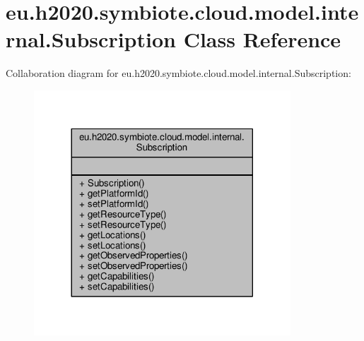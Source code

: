 \hypertarget{classeu_1_1h2020_1_1symbiote_1_1cloud_1_1model_1_1internal_1_1Subscription}{}\section{eu.\+h2020.\+symbiote.\+cloud.\+model.\+internal.\+Subscription Class Reference}
\label{classeu_1_1h2020_1_1symbiote_1_1cloud_1_1model_1_1internal_1_1Subscription}


Collaboration diagram for eu.\+h2020.\+symbiote.\+cloud.\+model.\+internal.\+Subscription\+:
\nopagebreak
\begin{figure}[H]
\begin{center}
\leavevmode
\includegraphics[width=272pt]{classeu_1_1h2020_1_1symbiote_1_1cloud_1_1model_1_1internal_1_1Subscription__coll__graph}
\end{center}
\end{figure}
